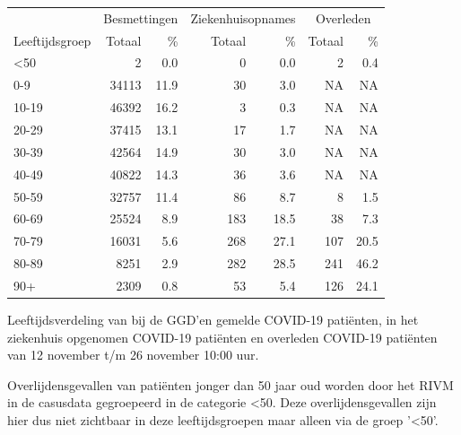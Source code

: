 \documentclass[
  english,
  man,floatsintext]{apa6}
\begin{document}
\begin{table}
\centering\begingroup\fontsize{11}{13}\selectfont

\begin{threeparttable}
\begin{tabular}{lrrrrrr}
\toprule
\multicolumn{1}{c}{ } & \multicolumn{2}{c}{Besmettingen} & \multicolumn{2}{c}{Ziekenhuisopnames} & \multicolumn{2}{c}{Overleden} \\
\cmidrule(l{3pt}r{3pt}){2-3} \cmidrule(l{3pt}r{3pt}){4-5} \cmidrule(l{3pt}r{3pt}){6-7}
Leeftijdsgroep & Totaal & \% & Totaal & \% & Totaal & \%\\
\midrule
<50 & 2 & 0.0 & 0 & 0.0 & 2 & 0.4\\
0-9 & 34113 & 11.9 & 30 & 3.0 & NA & NA\\
10-19 & 46392 & 16.2 & 3 & 0.3 & NA & NA\\
20-29 & 37415 & 13.1 & 17 & 1.7 & NA & NA\\
30-39 & 42564 & 14.9 & 30 & 3.0 & NA & NA\\
40-49 & 40822 & 14.3 & 36 & 3.6 & NA & NA\\
50-59 & 32757 & 11.4 & 86 & 8.7 & 8 & 1.5\\
60-69 & 25524 & 8.9 & 183 & 18.5 & 38 & 7.3\\
70-79 & 16031 & 5.6 & 268 & 27.1 & 107 & 20.5\\
80-89 & 8251 & 2.9 & 282 & 28.5 & 241 & 46.2\\
90+ & 2309 & 0.8 & 53 & 5.4 & 126 & 24.1\\
\bottomrule
\end{tabular}
\begin{tablenotes}
\item[1] Leeftijdsverdeling van bij de GGD’en gemelde COVID-19 patiënten, in het ziekenhuis opgenomen COVID-19 patiënten en overleden COVID-19 patiënten van 12 november t/m 26 november 10:00 uur.
\item[2] Overlijdensgevallen van patiënten jonger dan 50 jaar oud worden door het RIVM in de casusdata gegroepeerd in de categorie <50. Deze overlijdensgevallen zijn hier dus niet zichtbaar in deze leeftijdsgroepen maar alleen via de groep '<50'.
\end{tablenotes}
\end{threeparttable}
\endgroup{}
\end{table}

\newpage
\end{document}
